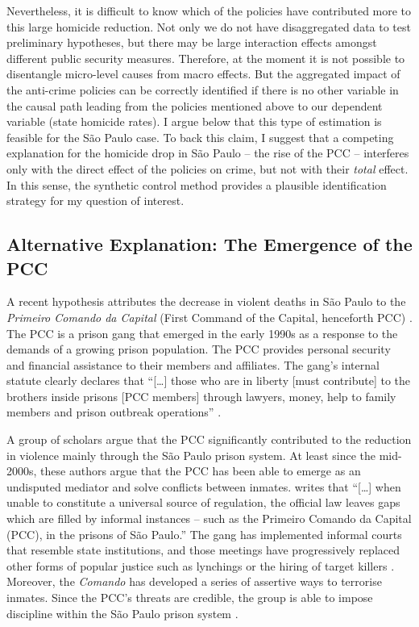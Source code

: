 Nevertheless, it is difficult to know which of the policies have contributed more to this large homicide reduction. Not only we do not have disaggregated data to test preliminary hypotheses, but there may be large interaction effects amongst different public security measures. Therefore, at the moment it is not possible to disentangle micro-level causes from macro effects. But the aggregated impact of the anti-crime policies can be correctly identified if there is no other variable in the causal path leading from the policies mentioned above to our dependent variable (state homicide rates). I argue below that this type of estimation is feasible for the São Paulo case. To back this claim, I suggest that a competing explanation for the homicide drop in São Paulo -- the rise of the PCC -- interferes only with the direct effect of the policies on crime, but not with their \emph{total} effect. In this sense, the synthetic control method provides a plausible identification strategy for my question of interest.

\subsection{Alternative Explanation: The Emergence of the PCC}
\label{sub:alternative_explanation_the_emergence_of_the_pcc}

A recent hypothesis attributes the decrease in violent deaths in São Paulo to the \emph{Primeiro Comando da Capital} (First Command of the Capital, henceforth PCC) \citep{biondi2010, dias2009, dias2011pulverizaccao, de2010crime, de2012governo, willis2015killing}. The PCC is a prison gang that emerged in the early 1990s as a response to the demands of a growing prison population. The PCC provides personal security and financial assistance to their members and affiliates. The gang's internal statute clearly declares that ``[\dots] those who are in liberty [must contribute] to the brothers inside prisons [PCC members] through lawyers, money, help to family members and prison outbreak operations'' \citep{folha2001estatutopcc}.

A group of scholars argue that the PCC significantly contributed to the reduction in violence mainly through the São Paulo prison system. At least since the mid-2000s, these authors argue that the PCC has been able to emerge as an undisputed mediator and solve conflicts between inmates. \citet[83]{dias2009ocupando} writes that ``[\dots] when unable to constitute a universal source of regulation, the official law leaves gaps which are filled by informal instances -- such as the Primeiro Comando da Capital (PCC), in the prisons of São Paulo.'' The gang has implemented informal courts that resemble state institutions, and those meetings have progressively replaced other forms of popular justice such as lynchings or the hiring of target killers \citep[3]{feltran2012metodos}. Moreover, the \emph{Comando} has developed a series of assertive ways to terrorise inmates. Since the PCC's threats are credible, the group is able to impose discipline within the São Paulo prison system \citep{biondi2010,dias2009}.

